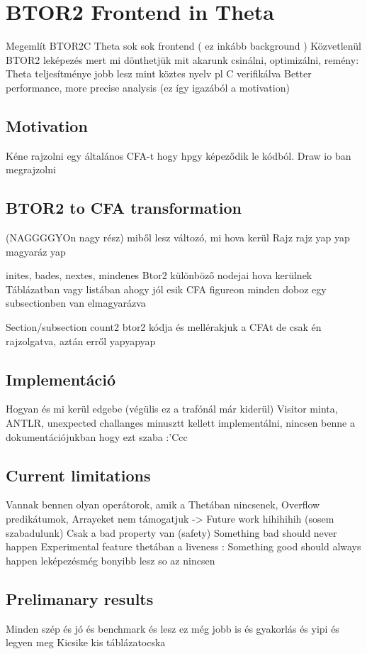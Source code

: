 \chapter{BTOR2 Frontend in Theta}

Megemlít BTOR2C
Theta sok sok frontend ( ez inkább background )
Közvetlenül BTOR2 leképezés mert mi dönthetjük mit akarunk csinálni, optimizálni, remény: Theta teljesítménye jobb lesz mint köztes nyelv pl C verifikálva
Better performance, more precise analysis (ez így igazából a motivation)
\section{Motivation}


Kéne rajzolni egy általános CFA-t hogy hpgy képeződik le kódból. Draw io ban megrajzolni

\section{BTOR2 to CFA transformation}
(NAGGGGYOn nagy rész) miből lesz változó, mi hova kerül
Rajz rajz yap yap magyaráz yap

inites, bades, nextes, mindenes
Btor2 különböző nodejai hova kerülnek
Táblázatban vagy listában ahogy jól esik
CFA figureon minden doboz egy subsectionben van elmagyarázva

Section/subsection count2 btor2 kódja és mellérakjuk a CFAt de csak én rajzolgatva, aztán erről yapyapyap

\section{Implementáció}
Hogyan és mi kerül edgebe (végülis ez a trafónál már kiderül) 
Visitor minta, ANTLR, unexpected challanges minusztt kellett implementálni, nincsen benne a dokumentációjukban hogy ezt szaba :'Ccc 

\section{Current limitations}
Vannak bennen olyan operátorok, amik a Thetában nincsenek, Overflow predikátumok, Arrayeket nem támogatjuk -> Future work hihihihih (sosem szabadulunk) 
Csak a bad property van (safety) Something bad should never happen
Experimental feature thetában a liveness : Something good should always happen leképezésmég bonyibb lesz so az nincsen
 
\section{Prelimanary results}
Minden szép és jó és benchmark és lesz ez még jobb is és gyakorlás és yipi és legyen meg
Kicsike kis táblázatocska

